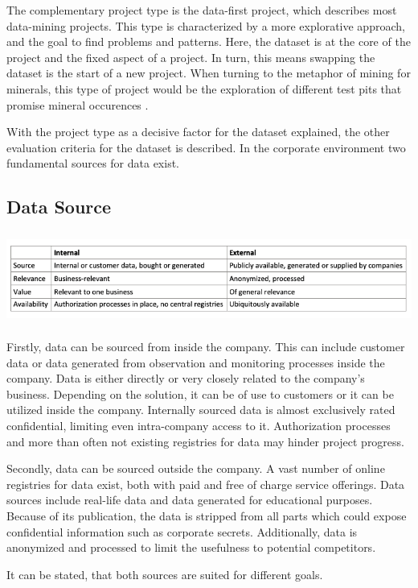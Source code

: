 	The complementary project type is the data-first project, which describes most data-mining projects. This type is characterized by a more explorative approach, and the goal to find problems and patterns. Here, the dataset is at the core of the project and the fixed aspect of a project. In turn, this means swapping the dataset is the start of a new project. When turning to the metaphor of mining for minerals, this type of project would be the exploration of different test pits that promise mineral occurences \cite{dataScienceProjectTypes}.
	
	With the project type as a decisive factor for the dataset explained, the other evaluation criteria for the dataset is described. In the corporate environment two fundamental sources for data exist. 
	
	\subsection{Data Source}
	\includegraphics[height=3cm]{Bilder/internal_external.png}
	
	Firstly, data can be sourced from inside the company. This can include customer data or data generated from observation and monitoring processes inside the company. Data is either directly or very closely related to the company's business. Depending on the solution, it can be of use to customers or it can be utilized inside the company. Internally sourced data is almost exclusively rated confidential, limiting even intra-company access to it. Authorization processes and more than often not existing registries for data may hinder project progress.
	
	Secondly, data can be sourced outside the company. A vast number of online registries for data exist, both with paid and free of charge service offerings. Data sources include real-life data and data generated for educational purposes. Because of its publication, the data is stripped from all parts which could expose confidential information such as corporate secrets. Additionally, data is anonymized and processed to limit the usefulness to potential competitors.
	
	It can be stated, that both sources are suited for different goals. 